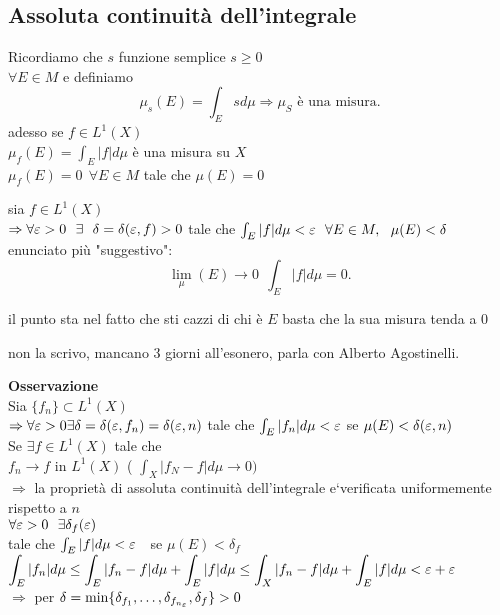 \documentclass[12px]{article}
\begin{document}
		\subsection{Assoluta continuità dell'integrale}
			Ricordiamo che $s$ funzione semplice $s\geq 0$\\
			 $\forall E\in M$ e definiamo
			  \[
				  \mu_s(E) = \int_Esd\mu \Rightarrow \mu_S \text{ è una misura}
			 .\]  
			 adesso se $f\in L^1(X)$\\
			 $\mu_f(E) = \int_E|f|d\mu$ è una misura su  $X$\\
			  $\mu_f(E) = 0\ \ \forall E\in M$  tale che  $\mu(E) = 0$
		\begin{teo}
sia $f\in L^1(X)$\\
 $ \Rightarrow  \forall \e > 0 \ \ \exists \ \ \delta = \delta(\e, f) > 0$ tale che $\int_E|f|d \mu < \e \ \ \forall E\in M, \ \ \mu(E) < \delta$\\
 enunciato più "suggestivo":
 \[
 \lim_\mu(E) \rightarrow 0 \ \ \int_E|f|d\mu = 0
 .\] 

		\end{teo}
		il punto sta nel fatto che sti cazzi di chi è $E$ basta che la sua misura tenda a $0$
		 \begin{dimo}
			non la scrivo, mancano 3 giorni all'esonero, parla con Alberto Agostinelli.
		\end{dimo}
		\textbf{Osservazione}\\
		Sia $\{f_n\}\subset L^1(X)$\\
		 $ \Rightarrow  \forall \varepsilon > 0 \exists \delta = \delta(\varepsilon,f_n) = \delta (\varepsilon,n)$ tale che $\int_E |f_n|d\mu < \varepsilon $ se  $\mu(E) < \delta (\varepsilon ,n)$\\
		 Se  $\exists f\in L^1(X)$ tale che \\
		 $f_n \rightarrow f$ in $L^1(X)$ ( $\int_X|f_N-f|d\mu \rightarrow 0)$\\
		 $ \Rightarrow  $ la proprietà di assoluta continuità dell'integrale e`verificata uniformemente rispetto a $n$\\
		  $\forall \varepsilon > 0 \ \ \exists \delta_f(\varepsilon)$\\
		  tale che $\int_E|f|d\mu < \varepsilon \ \ $ se  $\mu(E) < \delta_f$\\
		   $\displaystyle\int_E|f_n|d\mu \leq \int_E|f_n-f|d\mu + \int_E|f|d\mu\leq \int_X|f_n-f|d\mu + \int_E|f|d\mu < \varepsilon + \varepsilon$\\
		   $ \displaystyle\Rightarrow $  per $\delta = \min\{\delta_{f_1},\ldots,\delta_{f_{n_\varepsilon}}, \delta_f\} > 0 $\\
\end{document}
